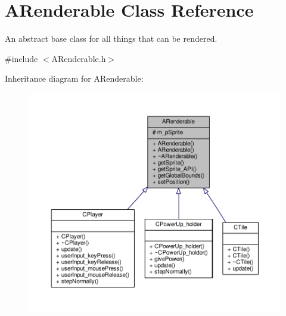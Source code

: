 \hypertarget{classARenderable}{\section{A\-Renderable Class Reference}
\label{classARenderable}
}


An abstract base class for all things that can be rendered.  




{\ttfamily \#include $<$A\-Renderable.\-h$>$}



Inheritance diagram for A\-Renderable\-:
\nopagebreak
\begin{figure}[H]
\begin{center}
\leavevmode
\includegraphics[width=350pt]{classARenderable__inherit__graph}
\end{center}
\end{figure}


